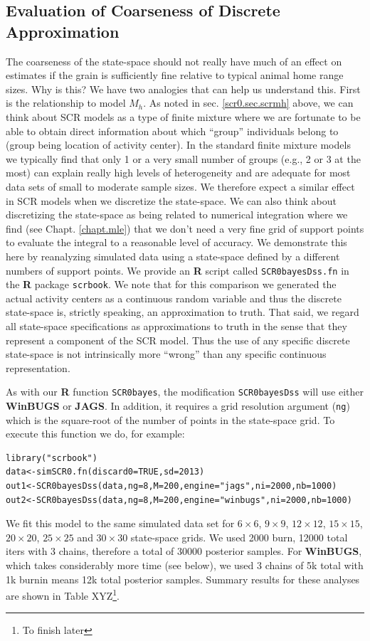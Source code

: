 {\subsection{Evaluation of Coarseness of Discrete Approximation}

The coarseness of the state-space should not really have much of an
effect on estimates if the grain is sufficiently fine relative to
typical animal home range sizes.  Why is this?  We have two analogies
that can help us understand this. First is the relationship to model
$M_{h}$.  As noted in sec. \ref{scr0.sec.scrmh} above, we can think
about SCR models as a type of finite mixture
\citep{norris_pollock:1996, pledger:2000} where we are fortunate to be
able to obtain direct information about which ``group'' individuals
belong to (group being location of activity center).  In the standard
finite mixture models we typically find that only 1 or a very small
number of groups (e.g., 2 or 3 at the most) can explain really high
levels of heterogeneity and are adequate for most data sets of small
to moderate sample sizes. We therefore expect a similar effect in SCR
models when we discretize the state-space.
We can also
think about discretizing the state-space as being related
to numerical integration where we find (see
Chapt. \ref{chapt.mle}) that we don't need a very fine
grid of support points to evaluate the integral to a reasonable
level of accuracy. We demonstrate this here by reanalyzing simulated
data using a state-space defined by a different numbers of support points.
We provide an {\bf R} script called \mbox{\tt SCR0bayesDss.fn} in the
{\bf R} package \mbox{\tt scrbook}.  We note that for this comparison
we generated the actual activity centers as a continuous random
variable and thus the discrete state-space is, strictly speaking, an
approximation to truth. That said, we regard all state-space
specifications as approximations to truth in the sense that they
represent a component of the SCR model.
Thus the use of any
specific discrete state-space is not intrinsically more ``wrong'' than
any specific continuous representation.

As with our {\bf R} function \mbox{\tt SCR0bayes}, the modification
\mbox{\tt SCR0bayesDss} will use either {\bf WinBUGS} or {\bf
  JAGS}. In addition, it requires a grid resolution argument
(\mbox{\tt ng}) which is the square-root of the number of points in
the state-space grid.
To execute this function we do, for example:
{\small
\begin{verbatim}
library("scrbook")
data<-simSCR0.fn(discard0=TRUE,sd=2013)
out1<-SCR0bayesDss(data,ng=8,M=200,engine="jags",ni=2000,nb=1000)
out2<-SCR0bayesDss(data,ng=8,M=200,engine="winbugs",ni=2000,nb=1000)
\end{verbatim}
}
We fit this model to the same simulated data set for 
$6 \times 6$, $9 \times 9$, $12 \times 12$, $15\times 15$,
$20\times 20$, $25 \times 25$ and $30 \times 30$ state-space grids.
We used 2000 burn, 12000 total iters with 3 chains, therefore a total
of 30000 posterior samples.
For {\bf WinBUGS}, which takes considerably more time (see below),
 we used 3 chains of 5k total with 1k burnin means 12k
total posterior samples.
Summary results for these analyses are shown in
Table XYZ\footnote{To finish later}.

}
